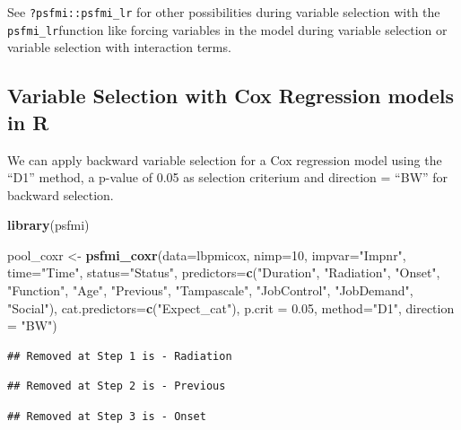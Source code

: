 \documentclass[
]{book}
\newenvironment{Shaded}{\begin{snugshade}}{\end{snugshade}}
\newcommand{\DataTypeTok}[1]{\textcolor[rgb]{0.13,0.29,0.53}{#1}}
\newcommand{\DecValTok}[1]{\textcolor[rgb]{0.00,0.00,0.81}{#1}}
\newcommand{\FloatTok}[1]{\textcolor[rgb]{0.00,0.00,0.81}{#1}}
\newcommand{\KeywordTok}[1]{\textcolor[rgb]{0.13,0.29,0.53}{\textbf{#1}}}
\newcommand{\NormalTok}[1]{#1}
\newcommand{\StringTok}[1]{\textcolor[rgb]{0.31,0.60,0.02}{#1}}
\begin{document}
See \texttt{?psfmi::psfmi\_lr} for other possibilities during variable selection with the \texttt{psfmi\_lr}function like forcing variables in the model during variable selection or variable selection with interaction terms.

\hypertarget{variable-selection-with-cox-regression-models-in-r}{%
\subsection{Variable Selection with Cox Regression models in R}\label{variable-selection-with-cox-regression-models-in-r}}

We can apply backward variable selection for a Cox regression model using the ``D1'' method, a p-value of 0.05 as selection criterium and direction = ``BW'' for backward selection.

\begin{Shaded}
\begin{Highlighting}[]
\KeywordTok{library}\NormalTok{(psfmi)}

\NormalTok{pool_coxr <-}\StringTok{ }\KeywordTok{psfmi_coxr}\NormalTok{(}\DataTypeTok{data=}\NormalTok{lbpmicox, }\DataTypeTok{nimp=}\DecValTok{10}\NormalTok{, }\DataTypeTok{impvar=}\StringTok{"Impnr"}\NormalTok{, }\DataTypeTok{time=}\StringTok{"Time"}\NormalTok{, }\DataTypeTok{status=}\StringTok{"Status"}\NormalTok{,}
  \DataTypeTok{predictors=}\KeywordTok{c}\NormalTok{(}\StringTok{"Duration"}\NormalTok{, }\StringTok{"Radiation"}\NormalTok{, }\StringTok{"Onset"}\NormalTok{, }\StringTok{"Function"}\NormalTok{, }\StringTok{"Age"}\NormalTok{,}
  \StringTok{"Previous"}\NormalTok{, }\StringTok{"Tampascale"}\NormalTok{, }\StringTok{"JobControl"}\NormalTok{, }\StringTok{"JobDemand"}\NormalTok{, }\StringTok{"Social"}\NormalTok{), }
  \DataTypeTok{cat.predictors=}\KeywordTok{c}\NormalTok{(}\StringTok{"Expect_cat"}\NormalTok{), }\DataTypeTok{p.crit =} \FloatTok{0.05}\NormalTok{, }\DataTypeTok{method=}\StringTok{"D1"}\NormalTok{, }\DataTypeTok{direction =} \StringTok{"BW"}\NormalTok{)}
\end{Highlighting}
\end{Shaded}

\begin{verbatim}
## Removed at Step 1 is - Radiation
\end{verbatim}

\begin{verbatim}
## Removed at Step 2 is - Previous
\end{verbatim}

\begin{verbatim}
## Removed at Step 3 is - Onset
\end{verbatim}
\end{document}
